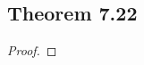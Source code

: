 \documentclass[../../main.tex]{subfiles}
\begin{document}
\subsection{Theorem 7.22}
\begin{wts}

\end{wts}
\begin{proof}

\end{proof}
\end{document}
